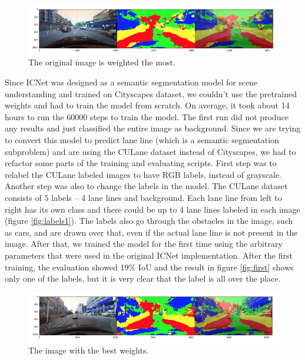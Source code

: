 \documentclass[twoside,twocolumn]{article}
\begin{document}
\begin{figure}
  \includegraphics[width=\linewidth]{4.png}
  \caption{The original image is weighted the most.}
  \label{fig:weights3}
\end{figure}

\par Since ICNet was designed as a semantic segmentation model for scene understanding and trained on Cityscapes dataset, we couldn't use the pretrained weights and had to train the model from scratch. On average, it took about 14 hours to run the 60000 steps to train the model. The first run did not produce any results and just classified the entire image as background. Since we are trying to convert this model to predict lane line (which is a semantic segmentation subproblem) and are using the CULane dataset instead of Cityscapes, we had to refactor some parts of the training and evaluating scripts. First step was to relabel the CULane labeled images to have RGB labels, instead of grayscale. Another step was also to change the labels in the model. The CULane dataset consists of 5 labels -- 4 lane lines and background. Each lane line from left to right has its own class and there could be up to 4 lane lines labeled in each image (figure \ref{fig:labels1}). The labels also go through the obstacles in the image, such as cars, and are drawn over that, even if the actual lane line is not present in the image.  After that, we trained the model for the first time using the arbitrary parameters that were used in the original ICNet implementation. After the first training, the evaluation showed 19\% IoU and the result in figure \ref{fig:first} shows only one of the labels, but it is very clear that the label is all over the place.


\begin{figure}
  \includegraphics[width=\linewidth]{5.png}
  \caption{The image with the best weights.}
  \label{fig:best}
\end{figure}
\end{document}
